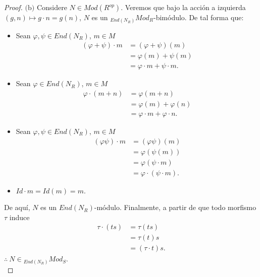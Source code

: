 \documentclass{article}
\newcommand{\lrprth}[1]{
	\left(#1\right)
}
\theoremstyle{definition}
\theoremstyle{plain}
\theoremstyle{plain}
\theoremstyle{definition}
\theoremstyle{definition}
\theoremstyle{definition}
\theoremstyle{definition}
\theoremstyle{definition}
\theoremstyle{definition}
\begin{document}
\begin{enumerate}[label=\textbf{Ej \arabic*.}]
\begin{proof}
	$\boxed{\text{(b)}}$ Considere $N \in Mod\lrprth{R^{op}}$. Veremos que bajo la acción a izquierda $\lrprth{g,n} \mapsto g \cdot n = g\lrprth{n}$, $N$ es un $_{End\lrprth{N_{R}}}Mod_{R}$-bimódulo. De tal forma que:
	\begin{itemize}
		\item Sean $\varphi , \psi \in End\lrprth{N_{R}}$, $m \in M$
		\begin{align*}
			\lrprth{ \varphi + \psi } \cdot m&=\lrprth{ \varphi + \psi }\lrprth{m}\\
			&=\varphi \lrprth{m} + \psi \lrprth{m}\\
			&=\varphi \cdot m + \psi \cdot m.
		\end{align*}
		\item Sean $\varphi\in End\lrprth{N_{R}}$, $m \in M$
		\begin{align*}
			\varphi\cdot\lrprth{m+n}&=\varphi\lrprth{m+n}\\
			&=\varphi\lrprth{m}+\varphi\lrprth{n}\\
			&=\varphi \cdot m + \varphi \cdot n.
		\end{align*}
		\item Sean $\varphi , \psi \in End\lrprth{N_{R}}$, $m \in M$
		\begin{align*}
			\lrprth{ \varphi\psi } \cdot m&=\lrprth{ \varphi\psi }\lrprth{m}\\
			&=\varphi \lrprth{ \psi \lrprth{m}}\\
			&=\varphi \lrprth{ \psi \cdot m}\\
			&=\varphi \cdot \lrprth{ \psi \cdot m}.
		\end{align*}
		\item $Id \cdot m=Id\lrprth{m}=m$.
	\end{itemize}
	De aquí, $N$ es un $End\lrprth{N_{R}}$-módulo. Finalmente, a partir de que todo morfismo $\tau$ induce 
	\begin{align*}
		\tau \cdot \lrprth{ts} &= \tau \lrprth{ts}\\
		&=\tau \lrprth{t}s\\
		&=\lrprth{ \tau \cdot t }s.
	\end{align*}
	$\therefore\ N \in {}_{End\lrprth{N_{R}}}Mod_{S}$.\\
\end{proof}
\end{enumerate}
\end{document}
